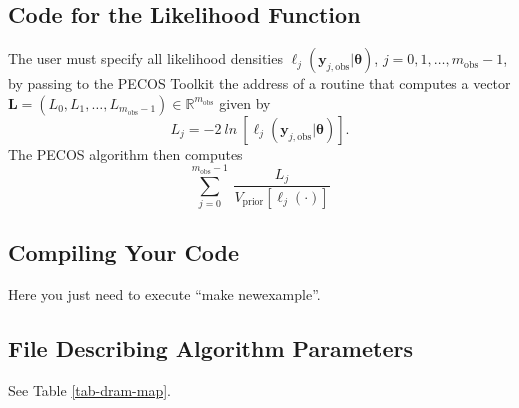 \subsection{Code for the Likelihood Function}\label{subsc-gmc-seven-steps-likelihood-code}

The user must specify all likelihood densities $\ell_j(\mathbf{y}_{j,\text{obs}}|\boldsymbol{\theta})$, $j=0,1,\ldots,m_{\text{obs}}-1$,
by passing to the PECOS Toolkit the address of a routine that computes a vector $\mathbf{L}=(L_0,L_1,\ldots,L_{m_{\text{obs}}-1})\in\mathbb{R}^{m_{\text{obs}}}$  given by
\begin{equation}\label{eq-m2l-likelihood}
L_j = -2~ln~
\left[
\ell_j(\mathbf{y}_{j,\text{obs}}|\boldsymbol{\theta})
\right].
\end{equation}
The PECOS algorithm then computes
\begin{equation*}
\sum_{j=0}^{m_{\text{obs}}-1}~\frac{L_j}{V_{\text{prior}}[\ell_j(\cdot)]}
\end{equation*}

\subsection{Compiling Your Code}\label{subsc-gmc-seven-steps-compile}

Here you just need to execute ``make newexample''.

\subsection{File Describing Algorithm Parameters}\label{subsc-gmc-seven-steps-alg-params}

See Table \ref{tab-dram-map}.

